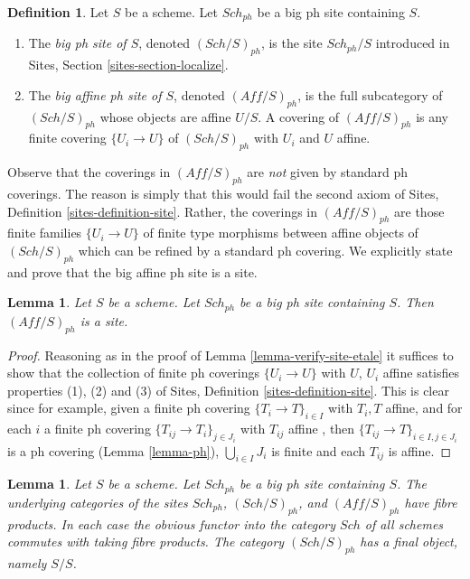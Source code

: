 \documentclass{stacks-project}
\theoremstyle{plain}
\newtheorem{lemma}[subsection]{Lemma}
\theoremstyle{definition}
\newtheorem{definition}[subsection]{Definition}
\theoremstyle{remark}
\numberwithin{equation}{subsection}
\def\Sch{\mathit{Sch}}
\begin{document}
\begin{definition}
\label{definition-big-small-ph}
Let $S$ be a scheme. Let $\Sch_{ph}$ be a big ph site containing $S$.
\begin{enumerate}
\item The {\it big ph site of $S$}, denoted
$(\Sch/S)_{ph}$, is the site $\Sch_{ph}/S$
introduced in Sites, Section \ref{sites-section-localize}.
\item The {\it big affine ph site of $S$}, denoted
$(\textit{Aff}/S)_{ph}$, is the full subcategory of
$(\Sch/S)_{ph}$ whose objects are affine $U/S$.
A covering of $(\textit{Aff}/S)_{ph}$ is any finite covering
$\{U_i \to U\}$ of $(\Sch/S)_{ph}$ with $U_i$ and $U$ affine.
\end{enumerate}
\end{definition}

\noindent
Observe that the coverings in $(\textit{Aff}/S)_{ph}$ are {\it not}
given by standard ph coverings. The reason is simply that this would
fail the second axiom of Sites, Definition \ref{sites-definition-site}.
Rather, the coverings in $(\textit{Aff}/S)_{ph}$ are those finite families
$\{U_i \to U\}$ of finite type morphisms between affine objects
of $(\Sch/S)_{ph}$ which can be refined by a standard ph covering.
We explicitly state and prove that the big affine ph site is a site.

\begin{lemma}
\label{lemma-verify-site-ph}
Let $S$ be a scheme. Let $\Sch_{ph}$ be a big ph
site containing $S$. Then $(\textit{Aff}/S)_{ph}$ is a site.
\end{lemma}

\begin{proof}
Reasoning as in the proof of Lemma \ref{lemma-verify-site-etale}
it suffices to show that the collection of finite ph coverings
$\{U_i \to U\}$ with $U$, $U_i$ affine satisfies properties
(1), (2) and (3) of
Sites, Definition \ref{sites-definition-site}.
This is clear since for example, given a finite ph covering
$\{T_i \to T\}_{i\in I}$ with $T_i, T$ affine, and for each
$i$ a finite ph covering $\{T_{ij} \to T_i\}_{j\in J_i}$ with $T_{ij}$
affine , then $\{T_{ij} \to T\}_{i \in I, j\in J_i}$ is a ph covering
(Lemma \ref{lemma-ph}), $\bigcup_{i\in I} J_i$ is finite and
each $T_{ij}$ is affine.
\end{proof}

\begin{lemma}
\label{lemma-fibre-products-ph}
Let $S$ be a scheme. Let $\Sch_{ph}$ be a big ph
site containing $S$. The underlying categories of the sites
$\Sch_{ph}$, $(\Sch/S)_{ph}$, and $(\textit{Aff}/S)_{ph}$ have fibre products.
In each case the obvious functor into the category $\Sch$ of
all schemes commutes with taking fibre products. The category
$(\Sch/S)_{ph}$ has a final object, namely $S/S$.
\end{lemma}
\end{document}
